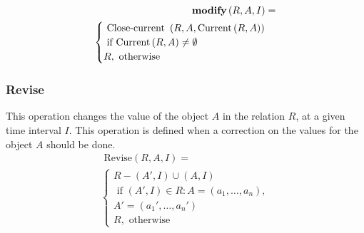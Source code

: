 \begin{align}
\label{eq:modify-fuzzy-temporal}
\mbox{\textbf{modify}} \left( R, A, I \right) =\\
\begin{cases}
\nonumber
\mbox{ Close-current }\left(R, A, \mbox{Current}\left(R, A \right) \right) \\
 \mbox{ if Current}\left(R ,A \right) \neq \emptyset \\
 R,  \mbox{ otherwise }
\end{cases}
\end{align}

\subsubsection{\label{subsubsec:revise-fuzzy-temporal}Revise}
This operation changes the value of the object $A$ in the relation $R$, at a given time interval $I$. This operation is defined when a correction on the values for the object $A$ should be done.
\begin{align}
\label{eq:revise-fuzzy-temporal}
\mbox{ Revise}\left(R, A, I \right)=\\
\begin{cases}
\nonumber
 R - \left(A', I \right) \cup \left(A, I \right)  \\
  \mbox{ if } \left(A', I \right) \in R: A = \left(a_1, \ldots, a_n \right),\\
A'= \left(a_1', \ldots, a_n' \right)   \\   
R,  \mbox{ otherwise }
\end{cases}
\end{align} 
